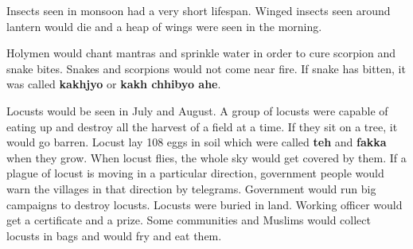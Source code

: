 Insects seen in monsoon had a very short lifespan. Winged insects seen around
lantern would die and a heap of wings were seen in the morning. 

Holymen would chant mantras and sprinkle water in order to cure scorpion and
snake bites. Snakes and scorpions would not come near fire. If snake has
bitten, it was called \textbf{kakhjyo} or \textbf{kakh chhibyo ahe}.

Locusts would be seen in July and August. A group of locusts were capable of
eating up and destroy all the harvest of a field at a time. If they sit on a
tree, it would go barren. Locust lay 108 eggs in soil which were called
\textbf{teh} and \textbf{fakka} when they grow. When locust flies, the whole
sky would get covered by them. If a plague of locust is moving in a particular
direction, government people would warn the villages in that direction by
telegrams. Government would run big campaigns to destroy locusts. Locusts were
buried in land. Working officer would get a certificate and a prize. Some
communities and Muslims would collect locusts in bags and would fry and eat
them.

